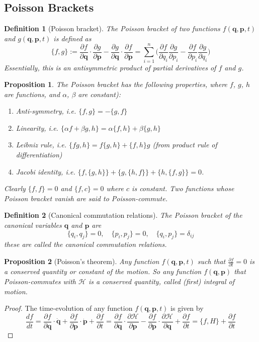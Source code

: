 \documentclass[a4paper]{article}
\newtheorem{defi}{Definition}[section]
\newtheorem{prop}{Proposition}[section]
\theoremstyle{new}
\begin{document}
\subsection{Poisson Brackets}
\begin{defi}[Poisson bracket]
The Poisson bracket of two functions $f(\mathbf{q}, \mathbf{p}, t)$ and $g(\mathbf{q}, \mathbf{p}, t)$ is defined as
$$\{f,g\}:=\frac{\partial f}{\partial\mathbf{q}}\cdot\frac{\partial g}{\partial\mathbf{p}}-\frac{\partial g}{\partial\mathbf{q}}\cdot\frac{\partial f}{\partial\mathbf{p}}=\sum_{i=1}^n\bigg(\frac{\partial f}{\partial q_i}\frac{\partial g}{\partial p_i}-\frac{\partial f}{\partial p_i}\frac{\partial g}{\partial q_i}\bigg)$$
Essentially, this is an antisymmetric product of partial derivatives of $f$ and $g$.
\end{defi}
\begin{prop}
The Poisson bracket has the following properties,  where  $f$, $g$, $h$ are functions, and $\alpha$, $\beta$ are constant):
\begin{enumerate}
    \item Anti-symmetry, i.e. $\{f,g\}=-\{g,f\}$
    \item Linearity, i.e. $\{\alpha f+\beta g,h\}=\alpha\{f,h\}+\beta\{g,h\}$
    \item Leibniz rule, i.e. $\{fg,h\}=f\{g,h\}+\{f,h\}g$ (from product rule of differentiation)
    \item Jacobi identity, i.e. $\{f,\{g,h\}\}+\{g,\{h,f\}\}+\{h,\{f,g\}\}=0$.
\end{enumerate}
Clearly $\{f, f\} = 0$ and $\{f, c\} = 0$ where $c$ is constant. Two functions whose Poisson bracket vanish are said to Poisson-commute.
\end{prop}
\begin{defi}[Canonical commutation relations]
The Poisson bracket of the canonical variables $\mathbf{q}$ and $\mathbf{p}$ are
$$\{q_i,q_j\}=0,\quad\{p_i,p_j\}=0,\quad\{q_i,p_j\}=\delta_{ij}$$
these are called the canonical commutation relations.  
\end{defi}
\begin{prop}[Poisson's theorem]
Any function $f(\mathbf{q}, \mathbf{p}, t)$ such that $\frac{\partial f}{\partial t}=0$ is a conserved quantity or constant of the motion. So any function $f(\mathbf{q}, \mathbf{p})$ that Poisson-commutes with $\mathcal{H}$ is a conserved quantity, called (first) integral of motion. 
\end{prop}
\begin{proof}
The time-evolution of any function $f(\mathbf{q}, \mathbf{p}, t)$ is given by
$$\frac{df}{dt}=\frac{\partial f}{\partial\mathbf{q}}\cdot\mathbf{\dot{q}}+\frac{\partial f}{\partial\mathbf{p}}\cdot\mathbf{\dot{p}}+\frac{\partial f}{\partial t}=\frac{\partial f}{\partial\mathbf{q}}\cdot\frac{\partial\mathcal{H}}{\partial\mathbf{p}}-\frac{\partial f}{\partial\mathbf{p}}\cdot\frac{\partial\mathcal{H}}{\partial\mathbf{q}}+\frac{\partial f}{\partial t}=\{f,H\}+\frac{\partial f}{\partial t}$$
\end{proof}
\end{document}
